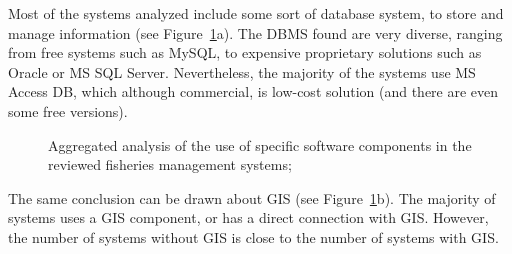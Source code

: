 \documentclass[11pt]{article} %
\begin{document}
Most of the systems analyzed include some sort of database system, to store and manage information (see Figure~\ref{analysis1}a). The DBMS found are very diverse, ranging from free systems such as MySQL, to expensive proprietary solutions such as Oracle or MS SQL Server. Nevertheless, the majority of the systems use MS Access DB, which although commercial, is low-cost solution (and there are even some free versions). 

\begin{figure}[ht]
\centering
{}
\caption[Aggregated analysis of the use of specific software components in the reviewed fisheries management systems;]
{Aggregated analysis of the use of specific software components in the reviewed fisheries management systems;}
\label{analysis1}
\end{figure}

The same conclusion can be drawn about GIS (see Figure~\ref{analysis1}b). The majority of systems uses a GIS component, or has a direct connection with GIS. However, the number of systems without GIS is close to the number of systems with GIS. 
\end{document}
